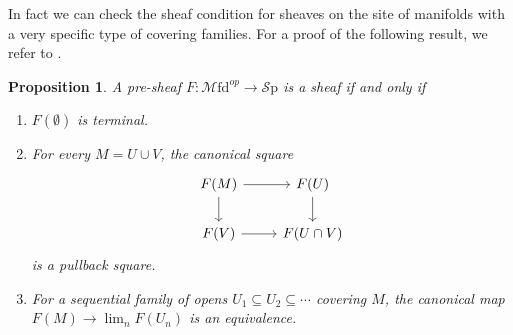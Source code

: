 \documentclass[10pt]{amsart}
\newcommand{\Sp}{\mathscr{S}\mathrm{p}}
\newcommand{\Mfd}{\mathscr{M}\mathrm{fd}}
\newtheorem{proposition}[equation]{Proposition}
\theoremstyle{definition}
\theoremstyle{remark}
\numberwithin{equation}{section}
\begin{document}
In fact we can check the sheaf condition for sheaves on the site of manifolds with a very specific type of covering families. For a proof of the following result, we refer to \cite[Proposition 3.6.6]{amabeldebrayhaine2021diffcoh}.

\begin{proposition}
  A pre-sheaf $F\colon \Mfd^{op} \to \Sp$ is a sheaf if and only if
  \begin{enumerate}
    \item $F(\emptyset)$ is terminal.
    \item For every $M = U \cup V$, the canonical square
    \[
      \begin{tikzcd}
        F(M) \ar[r] \ar[d] & F(U) \ar[d] \\
        F(V) \ar[r] & F(U \cap V)
      \end{tikzcd}
    \]is a pullback square. 
    \item For a sequential family of opens $U_1 \subseteq U_2 \subseteq \cdots$ covering $M$, the canonical map $F(M) \to \lim_{n} F(U_n)$ is an equivalence.
  \end{enumerate}
\end{proposition}
\end{document}
